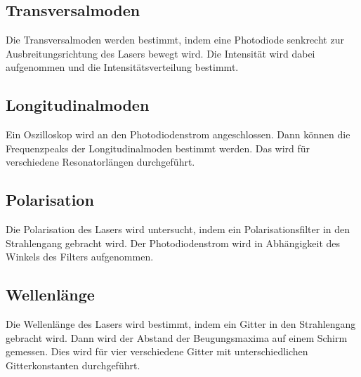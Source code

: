 \subsection{Transversalmoden}
Die Transversalmoden werden bestimmt, indem eine Photodiode senkrecht zur Ausbreitungsrichtung des Lasers bewegt wird. Die Intensität wird dabei aufgenommen und die Intensitätsverteilung
bestimmt.
\subsection{Longitudinalmoden}
Ein Oszilloskop wird an den Photodiodenstrom angeschlossen. Dann können die Frequenzpeaks der Longitudinalmoden bestimmt werden. Das wird für verschiedene Resonatorlängen durchgeführt.
\subsection{Polarisation}
Die Polarisation des Lasers wird untersucht, indem ein Polarisationsfilter in den Strahlengang gebracht wird. Der Photodiodenstrom wird in Abhängigkeit des Winkels des Filters aufgenommen.
\subsection{Wellenlänge}
Die Wellenlänge des Lasers wird bestimmt, indem ein Gitter in den Strahlengang gebracht wird. Dann wird der Abstand der Beugungsmaxima auf einem Schirm gemessen. Dies wird für vier verschiedene
Gitter mit unterschiedlichen Gitterkonstanten durchgeführt.

\newpage